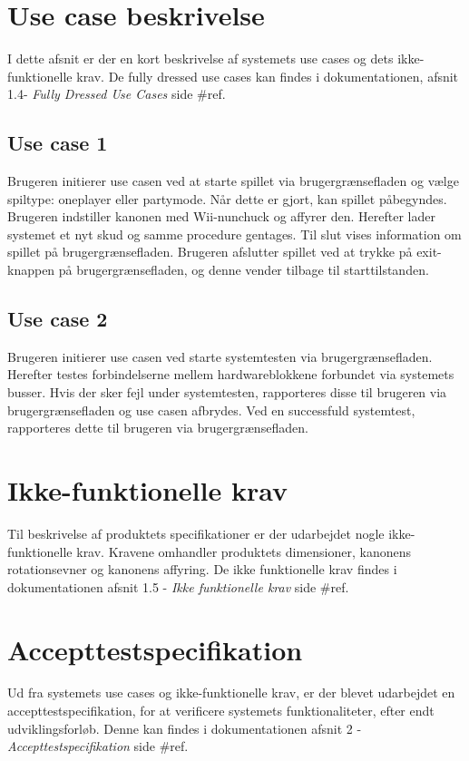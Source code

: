 \newpage
\section{Use case beskrivelse}
I dette afsnit er der en kort beskrivelse af systemets use cases og dets ikke-funktionelle krav. De fully dressed use cases kan findes i dokumentationen, afsnit 1.4- \textit{Fully Dressed Use Cases} side \#ref.

\subsection{Use case 1}
Brugeren initierer use casen ved at starte spillet via brugergrænsefladen og vælge spiltype: oneplayer eller partymode. Når dette er gjort, kan spillet påbegyndes. Brugeren indstiller kanonen med Wii-nunchuck og affyrer den. Herefter lader systemet et nyt skud og samme procedure gentages. Til slut vises information om spillet på brugergrænsefladen. Brugeren afslutter spillet ved at trykke på exit-knappen på brugergrænsefladen, og denne vender tilbage til starttilstanden. 

\subsection{Use case 2}
\label{afsnit:usecasebeskrivelseUC2}
Brugeren initierer use casen ved starte systemtesten via brugergrænsefladen. Herefter testes forbindelserne mellem hardwareblokkene forbundet via systemets busser. Hvis der sker fejl under systemtesten, rapporteres disse til brugeren via brugergrænsefladen og use casen afbrydes. Ved en successfuld systemtest, rapporteres dette til brugeren via brugergrænsefladen.

\section{Ikke-funktionelle krav}
Til beskrivelse af produktets specifikationer er der udarbejdet nogle ikke-funktionelle krav. Kravene omhandler produktets dimensioner, kanonens rotationsevner og kanonens affyring. De ikke funktionelle krav findes i dokumentationen afsnit 1.5 - \textit{Ikke funktionelle krav} side \#ref.

\section{Accepttestspecifikation}
Ud fra systemets use cases og ikke-funktionelle krav, er der blevet udarbejdet en accepttestspecifikation, for at verificere systemets funktionaliteter, efter endt udviklingsforløb. Denne kan findes i dokumentationen afsnit 2 - \textit{Accepttestspecifikation} side \#ref. 